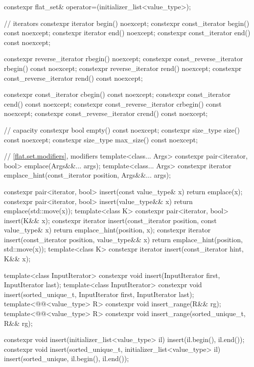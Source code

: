 \begin{codeblock}
{{    constexpr flat_set& operator=(initializer_list<value_type>);

    // iterators
    constexpr iterator               begin() noexcept;
    constexpr const_iterator         begin() const noexcept;
    constexpr iterator               end() noexcept;
    constexpr const_iterator         end() const noexcept;

    constexpr reverse_iterator       rbegin() noexcept;
    constexpr const_reverse_iterator rbegin() const noexcept;
    constexpr reverse_iterator       rend() noexcept;
    constexpr const_reverse_iterator rend() const noexcept;

    constexpr const_iterator         cbegin() const noexcept;
    constexpr const_iterator         cend() const noexcept;
    constexpr const_reverse_iterator crbegin() const noexcept;
    constexpr const_reverse_iterator crend() const noexcept;

    // capacity
    constexpr bool empty() const noexcept;
    constexpr size_type size() const noexcept;
    constexpr size_type max_size() const noexcept;

    // \ref{flat.set.modifiers}, modifiers
    template<class... Args> constexpr pair<iterator, bool> emplace(Args&&... args);
    template<class... Args>
      constexpr iterator emplace_hint(const_iterator position, Args&&... args);

    constexpr pair<iterator, bool> insert(const value_type& x)
      { return emplace(x); }
    constexpr pair<iterator, bool> insert(value_type&& x)
      { return emplace(std::move(x)); }
    template<class K> constexpr pair<iterator, bool> insert(K&& x);
    constexpr iterator insert(const_iterator position, const value_type& x)
      { return emplace_hint(position, x); }
    constexpr iterator insert(const_iterator position, value_type&& x)
      { return emplace_hint(position, std::move(x)); }
    template<class K> constexpr iterator insert(const_iterator hint, K&& x);

    template<class InputIterator>
      constexpr void insert(InputIterator first, InputIterator last);
    template<class InputIterator>
      constexpr void insert(sorted_unique_t, InputIterator first, InputIterator last);
    template<@@<value_type> R>
      constexpr void insert_range(R&& rg);
    template<@@<value_type> R>
      constexpr void insert_range(sorted_unique_t, R&& rg);

    constexpr void insert(initializer_list<value_type> il)
      { insert(il.begin(), il.end()); }
    constexpr void insert(sorted_unique_t, initializer_list<value_type> il)
      { insert(sorted_unique, il.begin(), il.end()); }

}}
\end{codeblock}
